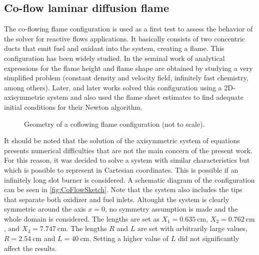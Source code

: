 
\subsection{Co-flow laminar diffusion flame}\label{ssec:coflowFlame}
The co-flowing flame configuration is used as a first test to assess the behavior of the solver for reactive flows applications. It basically consists of two concentric ducts that emit fuel and oxidant into the system, creating a flame. This configuration has been widely studied. In the seminal work of \cite{burkeDiffusionFlames1928} analytical expressions for the flame height and flame shape are obtained by studying a very simplified problem (constant density and velocity field, infinitely fast chemistry, among others). Later, \cite{smookeNumericalModelingAxisymmetric1992} and later works solved this configuration using a 2D-axisymmetric system and also used the flame sheet estimates to find adequate initial conditions for their Newton algorithm. 
\begin{figure}[t]
	\centering
	\def\svgwidth{0.43\textwidth}
	\qquad\quad
	\def\svgwidth{0.35\textwidth}
	\caption{Geometry of a coflowing flame configuration (not to scale).} \label{fig:CoFlowGeometry}
\end{figure}
It should be noted that the solution of the axisymmetric system of equations presents numerical difficulties that are not the main concern of the present work. For this reason, it was decided to solve a system with similar characteristics but which is possible to represent in Cartesian coordinates. This is possible if an infinitely long slot burner is considered. A schematic diagram of the configuration can be seen in \cref{fig:CoFlowSketch}. Note that the system also includes the tips that separate both oxidizer and fuel inlets. Altought the system is clearly symmetric around the axis $x = 0$, no symmetry assumption is made and the whole domain is considered.   The lengths are set as $X_1 = \SI{0.635}{\centi \meter}$, $X_2 = \SI{0.762}{\centi \meter}$, and $X_3 = \SI{7.747}{\centi \meter}$. The lengths $R$ and $L$ are set with arbitrarily large values,  $R = \SI{2.54}{\centi \meter}$ and $L = \SI{40}{\centi \meter}$. Setting a higher value of $L$ did not significantly affect the results. 
